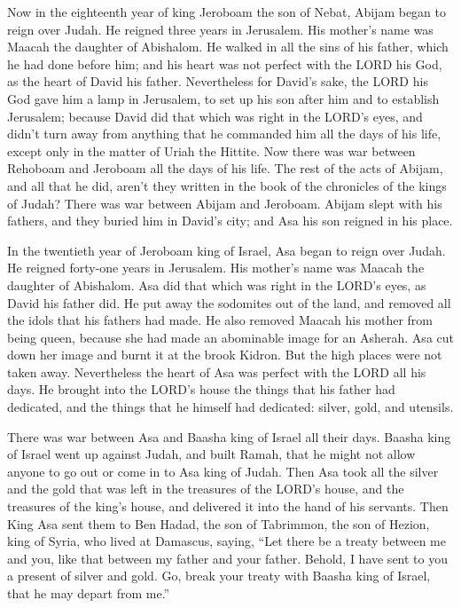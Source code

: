  Now in the eighteenth year of king Jeroboam the son of
Nebat, Abijam began to reign over Judah.  He reigned three
years in Jerusalem. His mother's name was Maacah the daughter of
Abishalom.  He walked in all the sins of his father, which
he had done before him; and his heart was not perfect with the LORD his
God, as the heart of David his father.  Nevertheless for
David's sake, the LORD his God gave him a lamp in Jerusalem, to set up
his son after him and to establish Jerusalem;  because David
did that which was right in the LORD's eyes, and didn't turn away from
anything that he commanded him all the days of his life, except only in
the matter of Uriah the Hittite.  Now there was war between
Rehoboam and Jeroboam all the days of his life.  The rest of
the acts of Abijam, and all that he did, aren't they written in the book
of the chronicles of the kings of Judah? There was war between Abijam
and Jeroboam.  Abijam slept with his fathers, and they
buried him in David's city; and Asa his son reigned in his place.

 In the twentieth year of Jeroboam king of Israel, Asa began
to reign over Judah.  He reigned forty-one years in
Jerusalem. His mother's name was Maacah the daughter of Abishalom.
 Asa did that which was right in the LORD's eyes, as David
his father did.  He put away the sodomites out of the land,
and removed all the idols that his fathers had made.  He
also removed Maacah his mother from being queen, because she had made an
abominable image for an Asherah. Asa cut down her image and burnt it at
the brook Kidron.  But the high places were not taken away.
Nevertheless the heart of Asa was perfect with the LORD all his days.
 He brought into the LORD's house the things that his
father had dedicated, and the things that he himself had dedicated:
silver, gold, and utensils.

 There was war between Asa and Baasha king of Israel all
their days.  Baasha king of Israel went up against Judah,
and built Ramah, that he might not allow anyone to go out or come in to
Asa king of Judah.  Then Asa took all the silver and the
gold that was left in the treasures of the LORD's house, and the
treasures of the king's house, and delivered it into the hand of his
servants. Then King Asa sent them to Ben Hadad, the son of Tabrimmon,
the son of Hezion, king of Syria, who lived at Damascus, saying,
 ``Let there be a treaty between me and you, like that
between my father and your father. Behold, I have sent to you a present
of silver and gold. Go, break your treaty with Baasha king of Israel,
that he may depart from me.''

